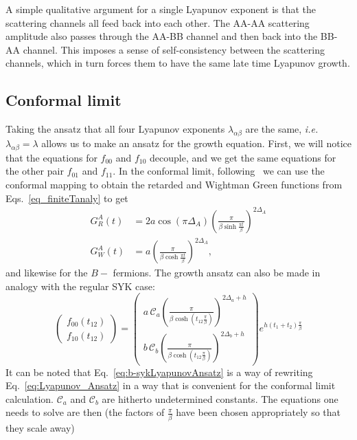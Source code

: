 A simple qualitative argument for a single Lyapunov exponent is that the scattering channels all feed back into each other.
The AA-AA scattering amplitude also passes through the AA-BB channel and then back into the BB-AA channel.
This imposes a sense of self-consistency between the scattering channels,
which in turn forces them to have the same late time Lyapunov growth.

\subsection{Conformal limit}
Taking the ansatz that all four Lyapunov exponents $\lambda_{\alpha\beta}$ are the same, {\it i.e.} $\lambda_{\alpha \beta}=\lambda$ allows us to make an ansatz for the growth equation. First, we will notice that the equations for $f_{00}$ and $f_{10}$ decouple, and we get the same equations for the other pair $f_{01}$ and $f_{11}$. 
In the conformal limit, following~\cite{maldacena_comments_2016} we can use the conformal mapping to obtain the retarded and Wightman Green functions from Eqs.~\eqref{eq_finiteTanaly} to get
\begin{subequations}
	\label{eq:ConfRealTimeGreens}
	\begin{align}
		G_R^A(t) &= 2 a \cos(\pi \Delta_{A})\left(\frac{\pi}{\beta \sinh\frac{\pi t}{\beta}}\right)^{2\Delta_{A}} \\
		G_W^A(t) &= a \left(\frac{\pi}{\beta\cosh\frac{\pi t}{\beta}}\right)^{2\Delta_A}, 
	\end{align}
\end{subequations}
and likewise for the $B-$ fermions. 
The growth ansatz can also be made in analogy with the regular SYK case: 
\begin{equation}
	\begin{pmatrix}
		f_{00}(t_{12}) \\ f_{10}(t_{12}) 
	\end{pmatrix}
	= \begin{pmatrix}
		a\,\mathcal{C}_a\left(\frac{\pi}{\beta\cosh{(t_{12}\frac{\pi}{\beta
				})}}\right)^{2\Delta_a + h} \\
		b\,\mathcal{C}_b\left(\frac{\pi}{\beta\cosh({t_{12}\frac{\pi}{\beta
			}})}\right)^{2\Delta_b + h}
	\end{pmatrix} e^{h(t_1+t_2)\frac{\pi}{\beta
	}} \label{eq:b-sykLyapunovAnsatz}
\end{equation}
It can be noted that Eq.~\eqref{eq:b-sykLyapunovAnsatz} is a way of rewriting Eq.~\eqref{eq:Lyapunov_Ansatz} in a way that is convenient for the conformal limit calculation. $\mathcal{C}_a $ and $ \mathcal{C}_b$ are hitherto undetermined constants. The equations one needs to solve are then (the factors of $\frac{\pi}{\beta}$ have been chosen appropriately so that they scale away) 
